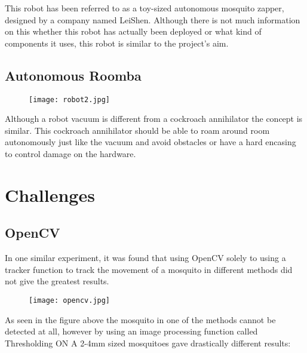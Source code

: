 \documentclass[11pt]{article}
\begin{document}
	This robot has been referred to as a toy-sized autonomous mosquito zapper, designed by a company named LeiShen. Although there is not much information on this whether this robot has actually been deployed or what kind of components it uses, this robot is similar to the project's aim.
	
	
	\subsection{Autonomous Roomba}
	\begin{center}
		
		
		\begin{figure}[H]
			\centering
			\texttt{[image: robot2.jpg]}
			
			\label{fig:Robot}
		\end{figure}
	\end{center}
	
	Although a robot vacuum is different from a cockroach annihilator the concept is similar. This cockroach annihilator should be able to roam around room autonomously just like the vacuum and avoid obstacles or have a hard encasing to control damage on the hardware.  
	\section{Challenges}


	
	\subsection{OpenCV}
	
	In one similar experiment, it was found that using OpenCV solely to using a tracker function to track the movement of a mosquito in different methods did not give the greatest results. 
	\begin{center}
		
		
		\begin{figure}[H]
			\centering
			\texttt{[image: opencv.jpg]}
			
			\label{fig:opencv}
		\end{figure}
	\end{center}
	As seen in the figure above the mosquito in one of the methods cannot be detected at all, however by using an image processing function called Thresholding ON A 2-4mm sized mosquitoes gave drastically different results:\cite{rakhmatulin_2021_raspberry}
	
\end{document}
